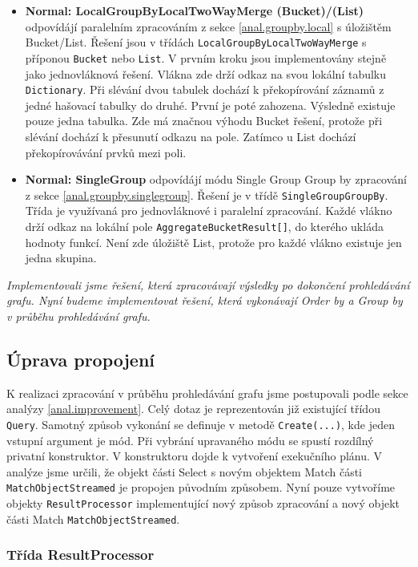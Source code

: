\begin{itemize}
\item \textbf{Normal: LocalGroupByLocalTwoWayMerge (Bucket)}\textbf{/(List)} odpovídájí paralelním zpracováním z sekce \ref{anal.groupby.local} s úložištěm Bucket/List.
Řešení jsou v třídách \texttt{LocalGroupByLocalTwoWayMerge} s příponou \texttt{Bucket} nebo \texttt{List}.
V prvním kroku jsou implementovány stejně jako jednovláknová řešení.
Vlákna zde drží odkaz na svou lokální tabulku \texttt{Dictionary}.
Při slévání dvou tabulek dochází k překopírování záznamů z jedné hašovací tabulky do druhé.
První je poté zahozena.
Výsledně existuje pouze jedna tabulka. 
Zde má značnou výhodu Bucket řešení, protože při slévání dochází k přesunutí odkazu na pole.
Zatímco u List dochází překopírovávání prvků mezi poli. 

\item \textbf{Normal: SingleGroup} odpovídájí módu Single Group Group by zpracování z sekce \ref{anal.groupby.singlegroup}.
Řešení je v třídě \texttt{SingleGroupGroupBy}.
Třída je využívaná pro jednovláknové i paralelní zpracování.
Každé vlákno drží odkaz na lokální pole \texttt{AggregateBucketResult[]}, do kterého ukláda hodnoty funkcí.
Není zde úložiště List, protože pro každé vlákno existuje jen jedna skupina.

\end{itemize}
\textit{Implementovali jsme řešení, která zpracovávají výsledky po dokončení prohledávání grafu.
Nyní budeme implementovat řešení, která vykonávají Order by a Group by v průběhu prohledávání grafu.}

\subsection{Úprava propojení}

K realizaci zpracování v průběhu prohledávání grafu jsme postupovali podle sekce analýzy \ref{anal.improvement}.
Celý dotaz je reprezentován již existující třídou \texttt{Query}.
Samotný způsob vykonání se definuje v metodě \texttt{Create(...)}, kde jeden vstupní argument je mód.
Při vybrání upravaného módu se spustí rozdílný privatní konstruktor.
V konstruktoru dojde k vytvoření exekučního plánu.
V analýze jsme určili, že objekt části Select s novým objektem Match části \texttt{MatchObjectStreamed} je propojen původním způsobem.
Nyní pouze vytvoříme objekty \texttt{ResultProcessor} implementující nový způsob zpracování a nový objekt části Match \texttt{MatchObjectStreamed}. 

\subsubsection{Třída ResultProcessor}

